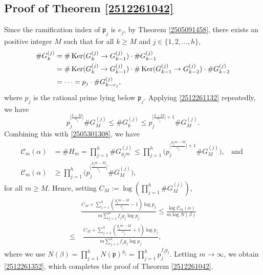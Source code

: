 \documentclass[12pt]{amsart}
\theoremstyle{plain}
\theoremstyle{definition}
\theoremstyle{remark}
\numberwithin{equation}{section}
\DeclareMathOperator{\ke}{Ker}
\newcommand{\F}{\mathbb{F}}
\newcommand{\CO}{\mathcal{O}}
\begin{document}
	\subsection{Proof of Theorem \ref{2512261042}}
	Since the ramification index of $\mathfrak{ p}_j$ is $e_j$, by Theorem \ref{2505091458}, there exists an positive integer $M$ such that for all $k\ge M$ and $j\in\{1,2,\dots,h\}$,
	\begin{align}
		\#G_{k}^{(j)}&=\#\ke(G_{k}^{(j)}\to G_{k-1}^{(j)})\cdot\#G_{k-1}^{(j)}  \notag\\
		&=\#\ke(G_{k}^{(j)}\to G_{k-1}^{(j)})\cdot\#\ke(G_{k-1}^{(j)}\to G_{k-2}^{(j)})\cdot\#G_{k-2}^{(j)}\notag\\
		&=\cdots=p_j\cdot\#G_{k-e_j}^{(j)},\label{2512261132}
	\end{align}
	where $p_j$ is the rational prime lying below $\mathfrak{p}_j$. Applying \eqref{2512261132} repeatedly, we have
	\begin{equation}
		p_j^{\big[\frac{k-M}{e_j}\big]}\#G_{M}^{(j)}\le\#G_{k}^{(j)}\le p_j^{\big[\frac{k-M}{e_j}\big]+1}\#G_{M}^{(j)}.
	\end{equation}
	Combining this with 
	\eqref{2505301308}, we have
	\begin{equation}
		\begin{split}
			\mathcal{C}_m(\alpha)&=\# H_m = \prod_{j=1}^h \# G_{g_jm}^{(j)} \le\prod_{j=1}^h \Big(p_j^{\big[\frac{g_jm-M}{e_j}\big]+1}\#G_{M}^{(j)}\Big),\;\;\text{ and }\\
			\mathcal{C}_m(\alpha)& \ge\prod_{j=1}^h \Big(p_j^{\big[\frac{g_jm-M}{e_j}\big]}\#G_{M}^{(j)}\Big),
		\end{split}
	\end{equation}
	for all $m\ge M$. Hence, setting $C_M:=\log(\prod_{j=1}^h\#G_{M}^{(j)})$, 
	\[\begin{split}
		&\frac{C_M+\sum_{j=1}^{h}(\frac{g_jm-M}{e_j}-1)\log p_j}{m\sum_{j=1}^{h}f_jg_j\log p_j}
		\le\frac{\log\mathcal{C}_m(\alpha)}{m\log N(\beta)}\\
		\le&\;\frac{C_M+\sum_{j=1}^{h}(\frac{g_jm-M}{e_j}+1)\log p_j}{m\sum_{j=1}^{h}f_jg_j\log p_j},
	\end{split}\]
	where we use $N(\beta)=\prod_{j=1}^{h}N(\mathfrak{ p})^{g_j}=\prod_{j=1}^{h}p_j^{f_jg_j}$. Letting \( m \to \infty \), we obtain \eqref{2512261352}, which completes the proof of Theorem \ref{2512261042}.
	
	
	
\end{document}
